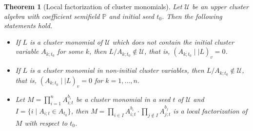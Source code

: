\documentclass{amsart}
\newtheorem{theorem}{Theorem}[section]
\theoremstyle{definition}
\theoremstyle{remark}
\numberwithin{equation}{section}
\begin{document}
\begin{theorem}[Local factorization of cluster monomials]\label{thmup}
Let $\mathcal U$ be an upper cluster algebra with coefficient semifield $\mathbb P$  and  initial seed $t_0$.  Then the following statements hold.

\begin{itemize}

\item[(i)]  If $L$ is a cluster monomial of $\mathcal U$ which does not contain the initial cluster variable $A_{k;t_0}$ for some $k$, then $L/A_{k;t_0}\notin\mathcal U$, that is, $(A_{k;t_0}\mid\mid L)_v=0$.

\item[(ii)] If $L$ is a cluster monomial in non-initial cluster variables, then  $L/A_{k;t_0}\notin\mathcal U$, that is, $(A_{k;t_0}\mid\mid L)_v=0$ for $k=1,\ldots,n$.
    \item[(iii)] Let $M=\prod\limits_{i=1}^nA_{i;t}^{b_i}$ be a cluster monomial in a seed $t$ of $\mathcal U$ and $I=\{i\mid A_{i;t}\in A_{t_0}\}$, then $M=\prod\limits_{i\in I}A_{i;t}^{b_i}\cdot\prod\limits_{j\notin I}A_{j;t}^{b_j}$ is a local factorization of $M$ with respect to $t_0$.
\end{itemize}
\end{theorem}
\end{document}
